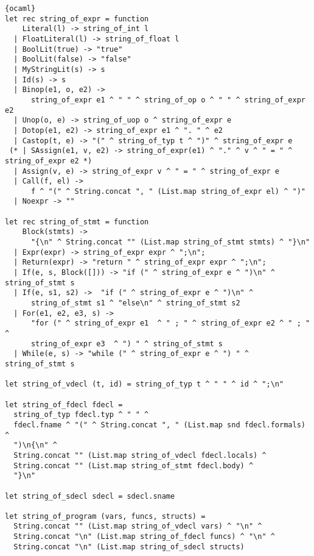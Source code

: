 \begin{lstlisting}{ocaml}
let rec string_of_expr = function
    Literal(l) -> string_of_int l
  | FloatLiteral(l) -> string_of_float l
  | BoolLit(true) -> "true"
  | BoolLit(false) -> "false"
  | MyStringLit(s) -> s
  | Id(s) -> s
  | Binop(e1, o, e2) ->
      string_of_expr e1 ^ " " ^ string_of_op o ^ " " ^ string_of_expr e2
  | Unop(o, e) -> string_of_uop o ^ string_of_expr e
  | Dotop(e1, e2) -> string_of_expr e1 ^ ". " ^ e2
  | Castop(t, e) -> "(" ^ string_of_typ t ^ ")" ^ string_of_expr e
 (* | SAssign(e1, v, e2) -> string_of_expr(e1) ^ "." ^ v ^ " = " ^ string_of_expr e2 *)
  | Assign(v, e) -> string_of_expr v ^ " = " ^ string_of_expr e
  | Call(f, el) ->
      f ^ "(" ^ String.concat ", " (List.map string_of_expr el) ^ ")"
  | Noexpr -> ""

let rec string_of_stmt = function
    Block(stmts) ->
      "{\n" ^ String.concat "" (List.map string_of_stmt stmts) ^ "}\n"
  | Expr(expr) -> string_of_expr expr ^ ";\n";
  | Return(expr) -> "return " ^ string_of_expr expr ^ ";\n";
  | If(e, s, Block([])) -> "if (" ^ string_of_expr e ^ ")\n" ^ string_of_stmt s
  | If(e, s1, s2) ->  "if (" ^ string_of_expr e ^ ")\n" ^
      string_of_stmt s1 ^ "else\n" ^ string_of_stmt s2
  | For(e1, e2, e3, s) ->
      "for (" ^ string_of_expr e1  ^ " ; " ^ string_of_expr e2 ^ " ; " ^
      string_of_expr e3  ^ ") " ^ string_of_stmt s
  | While(e, s) -> "while (" ^ string_of_expr e ^ ") " ^ string_of_stmt s

let string_of_vdecl (t, id) = string_of_typ t ^ " " ^ id ^ ";\n"

let string_of_fdecl fdecl =
  string_of_typ fdecl.typ ^ " " ^
  fdecl.fname ^ "(" ^ String.concat ", " (List.map snd fdecl.formals) ^
  ")\n{\n" ^
  String.concat "" (List.map string_of_vdecl fdecl.locals) ^
  String.concat "" (List.map string_of_stmt fdecl.body) ^
  "}\n"

let string_of_sdecl sdecl = sdecl.sname

let string_of_program (vars, funcs, structs) =
  String.concat "" (List.map string_of_vdecl vars) ^ "\n" ^
  String.concat "\n" (List.map string_of_fdecl funcs) ^ "\n" ^
  String.concat "\n" (List.map string_of_sdecl structs)
\end{lstlisting}
